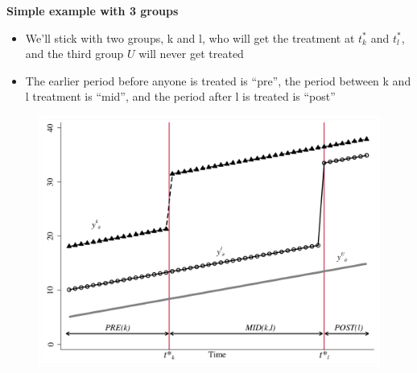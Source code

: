 \documentclass[notes=show]{beamer}
\begin{document}
\begin{frame}[plain]
\begin{center}
\textbf{Simple example with 3 groups}
\end{center}

\begin{itemize}
\item We'll stick with two groups, k and l, who will get the treatment at $t^*_k$ and $t^*_l$, and the third group $U$ will never get treated
\item The earlier period before anyone is treated is ``pre'', the period between k and l treatment is ``mid'', and the period after l is treated is ``post''
\end{itemize}

\end{frame} 

\begin{frame}[plain]

	\begin{figure}
	\includegraphics[scale=0.5]{./lecture_includes/bacon_goodman_2.png}
	\end{figure}

\end{frame}
\end{document}

